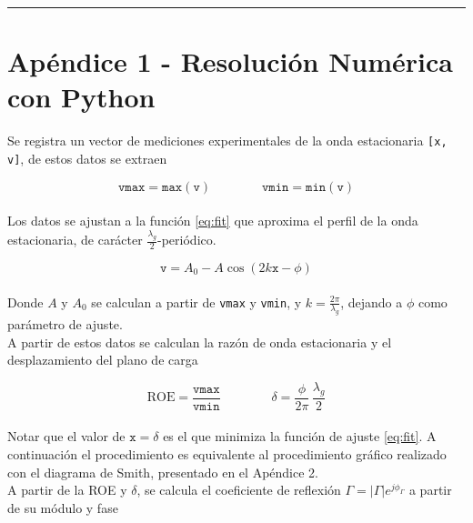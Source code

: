 \documentclass[11pt,a4paper]{article}
\begin{document}
\newpage
\begin{appendices}
\vspace{-1em}
\hrule
\vspace{1em}
\normalsize
\section{Apéndice 1 - Resolución Numérica con Python}
\begin{multicols}{2}
    Se registra un vector de mediciones experimentales de la onda estacionaria \texttt{[x, v]}, de estos datos se extraen

    \begin{equation*}
        \mathtt{vmax} = \mathtt{max(v)} \qquad \qquad \mathtt{vmin} = \mathtt{min(v)}
    \end{equation*}\\[-1em]

    Los datos se ajustan a la función \ref{eq:fit} que aproxima el perfil de la onda estacionaria, de carácter $\frac{\lambda_g}{2}$-periódico.

    \begin{equation}\label{eq:fit}
        \mathtt v = A_0 -A\cos(2k\mathtt x-\phi)
    \end{equation}\\[-1em]

    Donde $A$ y $A_0$ se calculan a partir de \texttt{vmax} y \texttt{vmin}, y $k = \frac{2\pi}{\lambda_g}$, dejando a $\phi$ como parámetro de ajuste.\\

    A partir de estos datos se calculan la razón de onda estacionaria y el desplazamiento del plano de carga

    \begin{equation*}
        \mathrm{ROE} = \frac{\mathtt{vmax}}{\mathtt{vmin}}\qquad\qquad\delta = \frac{\phi}{2\pi}\,\frac{\lambda_g}{2}
    \end{equation*}\\[-1em]

    Notar que el valor de $\mathtt{x} = \delta$ es el que minimiza la función de ajuste \ref{eq:fit}. A continuación el procedimiento es equivalente al procedimiento gráfico realizado con el diagrama de Smith, presentado en el Apéndice 2.\\

    A partir de la ROE y $\delta$, se calcula el coeficiente de reflexión $\Gamma = \left|\Gamma\right|e^{j\phi_\Gamma}$ a partir de su módulo y fase


\end{multicols}
\end{appendices}
\end{document}
